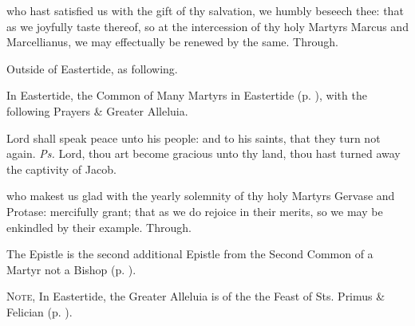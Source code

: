 
\postcommunion\label{MarcusMarcellianusPostcommunion}
 who hast satisfied us with the gift of thy salvation, we humbly beseech thee: that as we joyfully taste thereof, so at the intercession of thy holy Martyrs Marcus and Marcellianus, we may effectually be renewed by the same. Through.



\begin{rubric}
	Outside of Eastertide, as following.
\end{rubric}

\begin{rubric}
	In Eastertide, the Common of Many Martyrs in Eastertide (p. \pageref{CommonMartyrsEaster}), with the following Prayers \& Greater Alleluia.
\end{rubric}

\introit
{} Lord shall speak peace unto his people: and to his saints, that they turn not again. \textit{Ps.} Lord, thou art become gracious unto thy land, thou hast turned away the captivity of Jacob.

\collect
{} who makest us glad with the yearly solemnity of thy holy Martyrs Gervase and Protase: mercifully grant; that as we do rejoice in their merits, so we may be enkindled by their example. Through.

\begin{rubric}
	The Epistle is the second additional Epistle from the Second Common of a Martyr not a Bishop (p. \pageref{1Peter413}).
\end{rubric}


\begin{rubric}
	\textsc{Note,} In Eastertide, the Greater Alleluia is of the the Feast of Sts. Primus \& Felician (p. \pageref{PrimusFelicianGreaterAlleluia}).
\end{rubric}

